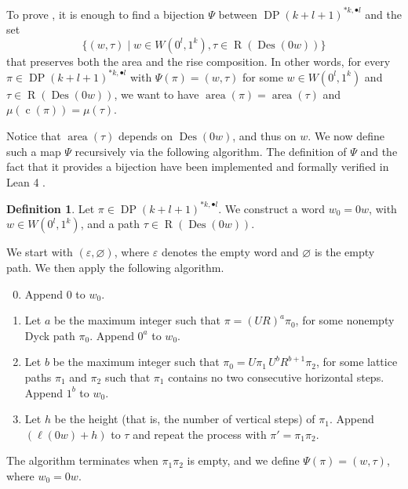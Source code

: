 \documentclass[reqno]{amsart}
\theoremstyle{plain}
\theoremstyle{definition}
\newtheorem{definition}[theorem]{Definition}
\theoremstyle{remark}
\DeclareMathOperator{\R}{R}
\DeclareMathOperator{\DP}{DP}
\DeclareMathOperator{\area}{area}
\DeclareMathOperator{\Des}{Des}
\DeclareMathOperator{\cc}{c}
\newcommand{\<}{\langle}
\renewcommand{\>}{\rangle}
\begin{document}
To prove , it is enough to find a bijection $\Psi$ between $\DP(k+l+1)^{\ast k, \bullet l}$ and the set
\[ \{ (w, \tau) \mid w\in W \left(0^l,1^k\right), \tau \in \R(\Des(0w)) \} \]
that preserves both the area and the rise composition. In other words, for every $\pi \in \DP(k+l+1)^{\ast k, \bullet l}$ with $\Psi(\pi) = (w,\tau)$ for some $w \in W\left(0^l,1^k\right)$ and $\tau \in \R(\Des(0w))$, we want to have $\area(\pi)=\area(\tau)$ and $\mu(\cc(\pi))=\mu(\tau)$.

Notice that $\area(\tau)$ depends on $\Des(0w)$, and thus on $w$. We now define such a map $\Psi$ recursively via the following algorithm. The definition of $\Psi$ and the fact that it provides a bijection have been implemented and formally verified in Lean 4 \cite{Iraci2026Code}.

\begin{definition}
    \label{def:psi}
    Let $\pi \in \DP(k+l+1)^{\ast k, \bullet l}$. We construct a word $w_0 = 0w$, with $w \in W(0^l, 1^k)$, and a path $\tau \in \R(\Des(0w))$.
    
    We start with $(\varepsilon, \varnothing)$, where $\varepsilon$ denotes the empty word and $\varnothing$ is the empty path. We then apply the following algorithm.

    \begin{enumerate}
      \setcounter{enumi}{-1}
        \item Append $0$ to $w_0$. \label{step:0}

        \item Let $a$ be the maximum integer such that $\pi = (UR)^a \pi_0$, for some nonempty Dyck path $\pi_0$. Append $0^a$ to $w_0$. \label{step:valleys}

        \item Let $b$ be the maximum integer such that $\pi_0 = U \pi_1 \,U^b R^{b+1} \pi_2$, for some lattice paths $\pi_1$ and $\pi_2$ such that $\pi_1$ contains no two consecutive horizontal steps. Append $1^b$ to $w_0$. \label{step:rises}

        \item Let $h$ be the height (that is, the number of vertical steps) of $\pi_1$. Append $(\ell(0w)+h)$ to $\tau$ and repeat the process with $\pi' = \pi_1 \pi_2$. \label{step:induction}
    \end{enumerate}

    The algorithm terminates when $\pi_1 \pi_2$ is empty, and we define $\Psi(\pi) = (w,\tau)$, where $w_0 = 0w$.
\end{definition}
\end{document}
